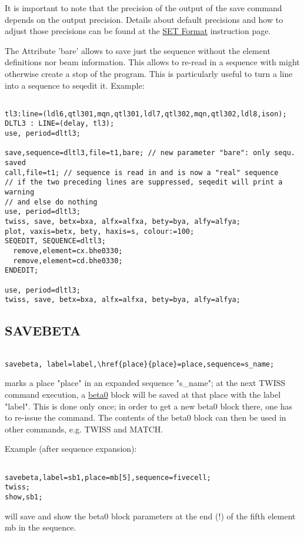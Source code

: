 It is important to note that the precision of the output of the save
command depends on the output precision. Details about default
precisions and how to adjust those precisions can be found at the
\href{../Introduction/set.html#Format}{SET Format} instruction page.   
 
The Attribute 'bare' allows to save just the sequence without the
element definitions nor beam information. This allows to re-read in a
sequence with might otherwise create a stop of the program. This is
particularly useful to turn a line into a sequence to seqedit
it. Example:  
\begin{verbatim}

tl3:line=(ldl6,qtl301,mqn,qtl301,ldl7,qtl302,mqn,qtl302,ldl8,ison);
DLTL3 : LINE=(delay, tl3);
use, period=dltl3;

save,sequence=dltl3,file=t1,bare; // new parameter "bare": only sequ. saved
call,file=t1; // sequence is read in and is now a "real" sequence
// if the two preceding lines are suppressed, seqedit will print a warning
// and else do nothing
use, period=dltl3;
twiss, save, betx=bxa, alfx=alfxa, bety=bya, alfy=alfya;
plot, vaxis=betx, bety, haxis=s, colour:=100;
SEQEDIT, SEQUENCE=dltl3;
  remove,element=cx.bhe0330;
  remove,element=cd.bhe0330;
ENDEDIT;

use, period=dltl3;
twiss, save, betx=bxa, alfx=alfxa, bety=bya, alfy=alfya;
\end{verbatim}


\subsection{SAVEBETA}
\begin{verbatim}

savebeta, label=label,\href{place}{place}=place,sequence=s_name;
\end{verbatim} 
marks a place "place" in an expanded sequence "s\_name"; at the next
TWISS command execution, a  \href{../twiss/twiss.html#beta0}{beta0}
block will be saved at that place with the label "label". This is done
only once; in order to get a new beta0 block there, one has to re-issue
the command. The contents of the beta0 block can then be used in other
commands, e.g. TWISS and MATCH.  

 Example (after sequence expansion): 
\begin{verbatim}

savebeta,label=sb1,place=mb[5],sequence=fivecell;
twiss;
show,sb1;
\end{verbatim} 
will save and show the beta0 block parameters at the end (!) of the
fifth element mb in the sequence.  


